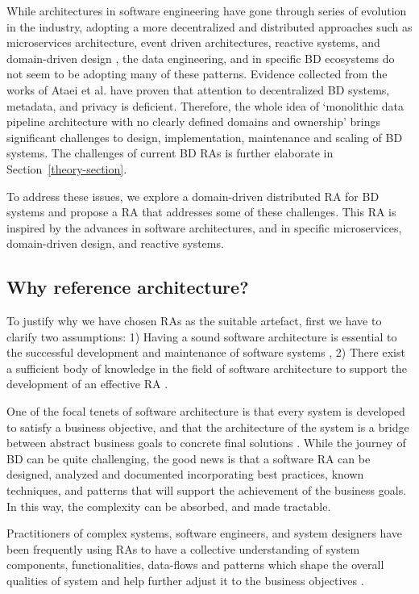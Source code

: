\documentclass[review]{elsarticle}
\begin{document}
While architectures in software engineering have gone through series of evolution in the industry, adopting a more decentralized and distributed approaches such as microservices architecture, event driven architectures, reactive systems, and domain-driven design \cite{alshuqayran2016systematic}, the data engineering, and in specific BD ecosystems do not seem to be adopting many of these patterns. Evidence collected from the works of Ataei et al. \cite{ataei2022state} have proven that attention to decentralized BD systems, metadata, and privacy is deficient. Therefore, the whole idea of `monolithic data pipeline architecture with no clearly defined domains and ownership' brings significant challenges to design, implementation, maintenance and scaling of BD systems. The challenges of current BD RAs is further elaborate in Section~\ref{theory-section}.

To address these issues, we explore a domain-driven distributed RA for BD systems and propose a RA that addresses some of these challenges. This RA is inspired by the advances in software architectures, and in specific microservices, domain-driven design, and reactive systems. 

\subsection{Why reference architecture?}

To justify why we have chosen RAs as the suitable artefact, first we have to clarify two assumptions: 1) Having a sound software architecture is essential to the successful development and maintenance of software systems \cite{SoftwareArchitectureKazman}, 2) There exist a sufficient body of knowledge in the field of software architecture to support the development of an effective RA \cite{AtaeiACIS}.


One of the focal tenets of software architecture is that every system is developed to satisfy a business objective, and that the architecture of the system is a bridge between abstract business goals to concrete final solutions \cite{SoftwareArchitectureKazman}. While the journey of BD can be quite challenging, the good news is that a software RA can be designed, analyzed and documented incorporating best practices, known techniques, and patterns that will support the achievement of the business goals. In this way, the complexity can be absorbed, and made tractable.

Practitioners of complex systems, software engineers, and system designers have been frequently using RAs to have a collective understanding of system components, functionalities, data-flows and patterns which shape the overall qualities of system and help further adjust it to the business objectives \cite{Cloutier,kohler2019towards}. 
\end{document}
